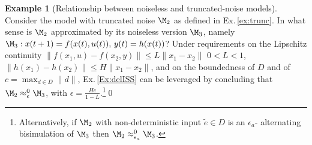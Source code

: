 \documentclass[letterpaper, 10 pt, conference]{amsart}
\theoremstyle{definition}
\theoremstyle{example}
\newtheorem{example}{Example}
\theoremstyle{remark}
\newcommand{\eps}{\epsilon}
\begin{document}
\begin{example}[Relationship between noiseless and truncated-noise models]\label{ex:noiseless}
Consider the model with truncated noise $\M_2$ as defined in Ex.\,\ref{ex:trunc}. 
In what sense is $\M_2$ approximated by its noiseless version $\M_3$, namely
\(\M_3: 
x(t+1)=f(x(t),u(t)),\,
y(t)=h(x(t))\)?
Under requirements on the Lipschitz continuity $\|f(x_1,u)-f(x_2,y)\|\leq L\|x_1-x_2\|$ $0< L<1$,  $\|h(x_1)-h(x_2)\|\leq H\|x_1-x_2\|$,  
and on the boundedness of $D$ and of $c=\max_{d\in D}\|d\|$, 
Ex.\,\ref{Ex:delISS} can be leveraged by concluding that $\M_2\approx_{\eps}^0 \M_3$, 
with $\eps=\frac{Hc}{1-L}$.\footnote{ Alternatively, if $\M_2$ with non-deterministic input $\tilde e\in D$ is an $\eps_a$- alternating bisimulation \cite{Tabuada2009b} of $\M_3$ then $\M_2\approx_{\eps_a}^0\M_3$. 
}\qed 
\end{example}
\smallskip 
\end{document}
